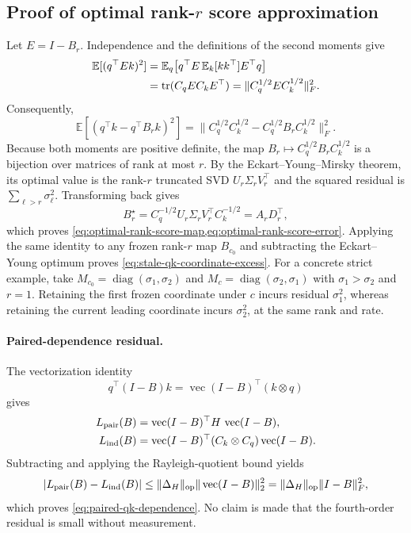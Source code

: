\subsection{Proof of optimal rank-$r$ score approximation}

Let $E=I-B_r$.  Independence and the definitions of the second moments give
\begin{align}
 \mathbb E[(q^\top E k)^2]
 &=\mathbb E_q\!\left[
 q^\top E\,\mathbb E_k[kk^\top]E^\top q\right]\\
 &=\operatorname{tr}(C_q E C_kE^\top)
 =\|C_q^{1/2}EC_k^{1/2}\|_F^2.
\end{align}
Consequently,
\begin{equation}
 \mathbb E[(q^\top k-q^\top B_rk)^2]
 =\|C_q^{1/2}C_k^{1/2}
   -C_q^{1/2}B_rC_k^{1/2}\|_F^2.
\end{equation}
Because both moments are positive definite, the map
$B_r\mapsto C_q^{1/2}B_rC_k^{1/2}$ is a bijection over matrices of rank at
most $r$.  By the Eckart--Young--Mirsky theorem, its optimal value is the
rank-$r$ truncated SVD $U_r\Sigma_rV_r^\top$ and the squared residual is
$\sum_{\ell>r}\sigma_\ell^2$.  Transforming back gives
\begin{equation}
 B_r^\star=C_q^{-1/2}U_r\Sigma_rV_r^\top C_k^{-1/2}
 =A_rD_r^\top,
\end{equation}
which proves \cref{eq:optimal-rank-score-map,eq:optimal-rank-score-error}.
Applying the same identity to any frozen rank-$r$ map $B_{c_0}$ and
subtracting the Eckart--Young optimum proves
\cref{eq:stale-qk-coordinate-excess}.  For a concrete strict example, take
$M_{c_0}=\operatorname{diag}(\sigma_1,\sigma_2)$ and
$M_c=\operatorname{diag}(\sigma_2,\sigma_1)$ with
$\sigma_1>\sigma_2$ and $r=1$.  Retaining the first frozen coordinate under
$c$ incurs residual $\sigma_1^2$, whereas retaining the current leading
coordinate incurs $\sigma_2^2$, at the same rank and rate.

\paragraph{Paired-dependence residual.}
The vectorization identity
\begin{equation}
 q^\top(I-B)k
 =\operatorname{vec}(I-B)^\top(k\otimes q)
\end{equation}
gives
\begin{align}
 L_{\rm pair}(B)
 &=\operatorname{vec}(I-B)^\top
 H\,\operatorname{vec}(I-B),\\
 L_{\rm ind}(B)
 &=\operatorname{vec}(I-B)^\top
 (C_k\otimes C_q)\operatorname{vec}(I-B).
\end{align}
Subtracting and applying the Rayleigh-quotient bound yields
\begin{equation}
 |L_{\rm pair}(B)-L_{\rm ind}(B)|
 \le\|\Delta_H\|_{\mathrm{op}}
 \|\operatorname{vec}(I-B)\|_2^2
 =\|\Delta_H\|_{\mathrm{op}}\|I-B\|_F^2,
\end{equation}
which proves \cref{eq:paired-qk-dependence}.  No claim is made that the
fourth-order residual is small without measurement.

